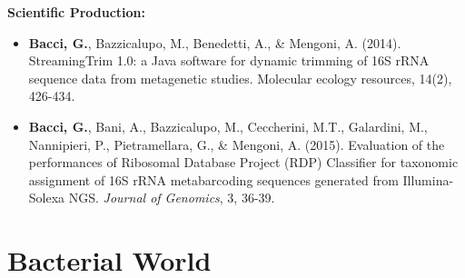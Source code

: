\documentclass[10pt]{beamer}
\begin{document}
\begin{frame}
	\textbf{\Large{Scientific Production:}}
	\begin{itemize}
		\item \textbf{Bacci, G.}, Bazzicalupo, M., Benedetti, A., \& Mengoni, A. (2014). StreamingTrim 1.0: a Java software for dynamic trimming of 16S rRNA sequence data from metagenetic studies. Molecular ecology resources, 14(2), 426-434.
		\item \textbf{Bacci, G.}, Bani, A., Bazzicalupo, M., Ceccherini, M.T., Galardini, M., Nannipieri, P., Pietramellara, G., \& Mengoni, A. (2015). Evaluation of the performances of Ribosomal Database Project (RDP) Classifier for taxonomic assignment of 16S rRNA metabarcoding sequences generated from Illumina-Solexa NGS. \textit{Journal of Genomics}, 3, 36-39.
	\end{itemize}
\end{frame}

\section{Bacterial World}
\subsection{}

\newif\iffondimod
\fondimodtrue
\end{document}
